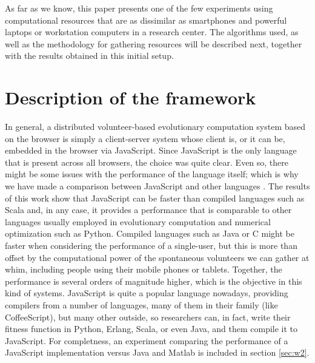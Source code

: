 \documentclass[journal,onecolumn]{IEEEtran}
\begin{document}
As far as we know, this paper presents one of the few experiments using %
computational resources that are as dissimilar as smartphones and
powerful laptops 
or workstation computers in a research center. 
The algorithms used, as well as the methodology 
for gathering resources will be described next, 
together with the results obtained in this initial setup.
\section{Description of the framework}
\label{sec:description}

In general, a distributed volunteer-based evolutionary computation
system based on the browser is simply a client-server system
whose client is, or it can be, embedded in the browser via
JavaScript. Since JavaScript is  the only language that is present
across all browsers, the choice was quite clear. Even so, there might
be some issues with the performance of the language itself; which %
 is
why we have made a comparison between JavaScript and other languages
\cite{2015arXiv151101088M}. The results of this work show that JavaScript can be
faster than compiled languages such as Scala and, in any case, it provides
a performance that is comparable to other languages usually employed %
in evolutionary computation and numerical optimization such as Python. 
Compiled languages such as
Java or C might be faster when %
considering the performance of a single-user, 
but this is more than offset by the computational power of
the spontaneous volunteers we can gather at whim, including people
using their mobile phones or tablets. Together, the performance is several orders of magnitude
higher, which is the objective in this kind of systems.
 JavaScript is
quite a popular language nowadays, providing compilers from a number
of languages, many of them in their family (like CoffeeScript), but
many other outside, so researchers can, in fact, write their fitness
function in Python, Erlang, Scala, or even Java, and them compile it to
JavaScript. For completness, an experiment comparing the performance of
a JavaScript implementation versus Java and Matlab is included in section
\ref{sec:w2}.
\end{document}
